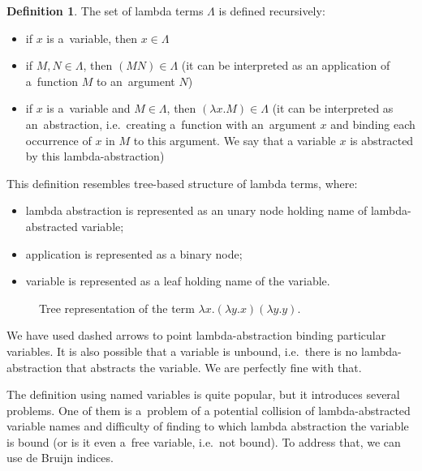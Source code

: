 \documentclass[final]{article}
\theoremstyle{definition}
\newtheorem{definition}{Definition}[subsection]
\theoremstyle{definition}
\theoremstyle{remark}
\begin{document}
\begin{definition}
    The set of lambda terms \(\Lambda\) is defined recursively:
    \begin{itemize}
        \item if \(x\) is a~variable, then \(x \in \Lambda\)
        \item if \(M, N \in \Lambda\), then \((M N) \in \Lambda\) (it can be interpreted as an application of a~function \(M\) to an~argument \(N\))
        \item if \(x\) is a~variable and \(M \in \Lambda\), then \((\lambda x. M) \in \Lambda\) (it can be interpreted as an~abstraction, i.e.~creating a~function with an~argument \(x\) and binding each occurrence of \(x\) in \(M\) to this argument. We say that a variable \(x\) is abstracted by this lambda-abstraction)
    \end{itemize}
\end{definition}

This definition resembles tree-based structure of lambda terms, where:
\begin{itemize}
    \item lambda abstraction is represented as an unary node holding name of lambda-abstracted variable;
    \item application is represented as a binary node;
    \item variable is represented as a leaf holding name of the variable.
\end{itemize}

\begin{figure}[H]
    \centering
    
    \caption{Tree representation of the term \(\lambda x. (\lambda y.x) (\lambda y.y)\).}%
    \label{fig:lambda_tree_example}
\end{figure}

We have used dashed arrows to point lambda-abstraction binding particular variables. It is also possible that a variable is unbound, i.e.~there is no lambda-abstraction that abstracts the variable. We are perfectly fine with that.

The definition using named variables is quite popular, but it introduces several problems. One of them is a~problem of a potential collision of lambda-abstracted variable names and difficulty of finding to which lambda abstraction the variable is bound (or is it even a~free variable, i.e.~not bound). To address that, we can use de Bruijn indices.
\end{document}
